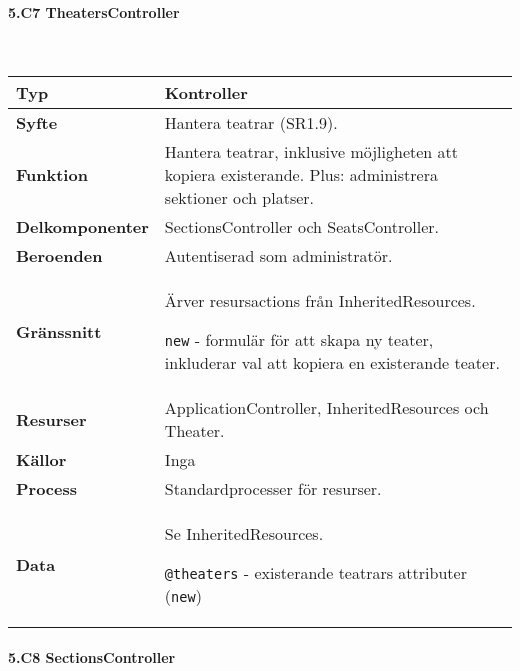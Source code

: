 \documentclass[a4paper, twoside, 11pt, titlepage]{article}
\begin{document}
			\paragraph{5.C7 TheatersController}\

			\begin {table} [ht] \begin{tabular} {  p{3.5cm} p{11.6cm} }
				\hline
				{\sffamily\textbf{Typ}} & {Kontroller} \\
				\hline
				{\sffamily\textbf{Syfte}} & {Hantera teatrar (SR1.9).} \\
				\hline
				{\sffamily\textbf{Funktion}} & {Hantera teatrar, inklusive möjligheten att kopiera existerande. Plus: administrera sektioner och platser.} \\
				\hline
				{\sffamily\textbf{Delkomponenter}} & {SectionsController och SeatsController.} \\
				\hline
				{\sffamily\textbf{Beroenden}} & {Autentiserad som administratör.} \\
				\hline
				{\sffamily\textbf{Gränssnitt}} & {Ärver resursactions från InheritedResources.

{\tt new} - formulär för att skapa ny teater, inkluderar val att kopiera en existerande teater.} \\
				\hline
				{\sffamily\textbf{Resurser}} & {ApplicationController, InheritedResources och Theater.} \\
				\hline
				{\sffamily\textbf{Källor}} & {Inga} \\
				\hline
				{\sffamily\textbf{Process}} & {Standardprocesser för resurser.} \\
				\hline
				{\sffamily\textbf{Data}} & {Se InheritedResources.

{\tt @theaters} - existerande teatrars attributer ({\tt new})} \\
				\hline
			\end{tabular} \end{table} \FloatBarrier


			\paragraph{5.C8 SectionsController}\
\end{document}
